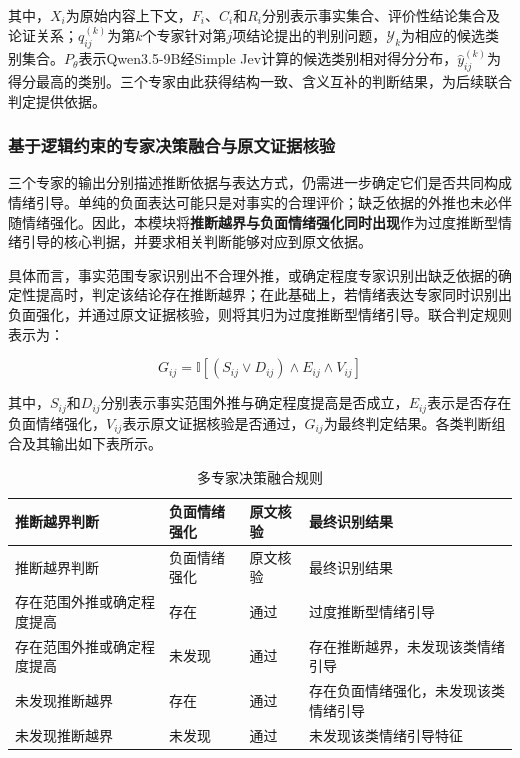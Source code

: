 其中，\(X_i\)为原始内容上下文，\(F_i\)、\(C_i\)和\(R_i\)分别表示事实集合、评价性结论集合及论证关系；\(q_{ij}^{(k)}\)为第\(k\)个专家针对第\(j\)项结论提出的判别问题，\(\mathcal Y_k\)为相应的候选类别集合。\(P_{\theta}\)表示Qwen3.5-9B经Simple Jev计算的候选类别相对得分分布，\(\hat y_{ij}^{(k)}\)为得分最高的类别。三个专家由此获得结构一致、含义互补的判断结果，为后续联合判定提供依据。

\subsubsection{基于逻辑约束的专家决策融合与原文证据核验}\label{section:2.3.3}

三个专家的输出分别描述推断依据与表达方式，仍需进一步确定它们是否共同构成情绪引导。单纯的负面表达可能只是对事实的合理评价；缺乏依据的外推也未必伴随情绪强化。因此，本模块将\textbf{推断越界与负面情绪强化同时出现}作为过度推断型情绪引导的核心判据，并要求相关判断能够对应到原文依据。

具体而言，事实范围专家识别出不合理外推，或确定程度专家识别出缺乏依据的确定性提高时，判定该结论存在推断越界；在此基础上，若情绪表达专家同时识别出负面强化，并通过原文证据核验，则将其归为过度推断型情绪引导。联合判定规则表示为：

\begin{equation}
G_{ij}=\mathbb I\!\left[(S_{ij}\lor D_{ij})\land E_{ij}\land V_{ij}\right]
\label{eq:2-12}
\end{equation}

其中，\(S_{ij}\)和\(D_{ij}\)分别表示事实范围外推与确定程度提高是否成立，\(E_{ij}\)表示是否存在负面情绪强化，\(V_{ij}\)表示原文证据核验是否通过，\(G_{ij}\)为最终判定结果。各类判断组合及其输出如下表所示。

\begingroup
\small
\begin{longtable}{@{}
>{\RaggedRight\arraybackslash}p{}
>{\RaggedRight\arraybackslash}p{}
>{\RaggedRight\arraybackslash}p{}
>{\RaggedRight\arraybackslash}p{}@{}}
\caption{多专家决策融合规则}\label{tab:2-3}\tabularnewline
\toprule
推断越界判断 & 负面情绪强化 & 原文核验 & 最终识别结果 \\
\midrule
\endfirsthead
\toprule
推断越界判断 & 负面情绪强化 & 原文核验 & 最终识别结果 \\
\midrule
\endhead
\bottomrule
\endlastfoot
存在范围外推或确定程度提高 & 存在 & 通过 & 过度推断型情绪引导 \\
存在范围外推或确定程度提高 & 未发现 & 通过 & 存在推断越界，未发现该类情绪引导 \\
未发现推断越界 & 存在 & 通过 & 存在负面情绪强化，未发现该类情绪引导 \\
未发现推断越界 & 未发现 & 通过 & 未发现该类情绪引导特征 \\
\end{longtable}
\endgroup

